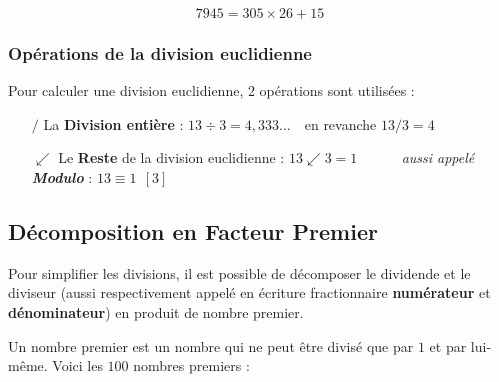 \documentclass[a4paper]{article}
\begin{document}
\vspace{-6 mm}

{\large $$7945 = 305 \times 26 + 15 $$ }

\vfill

\subsubsection*{Opérations de la division euclidienne}

Pour calculer une division euclidienne, 2 opérations sont utilisées :

	\vspace{2 mm}

	\begin{itemize}
	
	\item[$/$] La \textbf{Division entière} : $13\div3 = 4,333\dots ~~~ $ en revanche $13/3 = 4$
	\item[$\swarrow$] Le \textbf{Reste} de la division euclidienne : $13 \swarrow 3 = 1$ ~~~~~ \textit{aussi appelé \textbf{Modulo}} : $13 \equiv 1 ~~ [3]$
	
	\end{itemize}

\vspace{4 mm}

\pagebreak







\subsection{Décomposition en Facteur Premier}

Pour simplifier les divisions, il est possible de décomposer le dividende et le diviseur (aussi respectivement appelé en écriture fractionnaire \textbf{numérateur} et \textbf{dénominateur}) en produit de nombre premier. 

\vspace{2 mm}


Un nombre premier est un nombre qui ne peut être divisé que par $1$ et par lui-même. Voici les $100$ nombres premiers :
\end{document}
